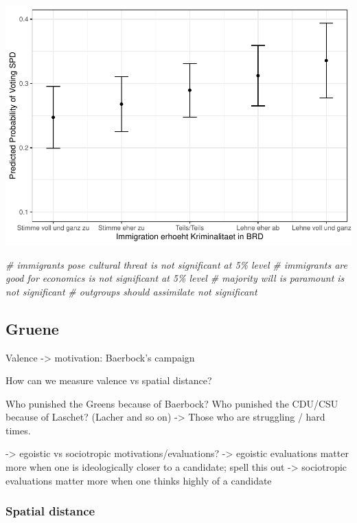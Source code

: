 \documentclass[
]{article}
\newenvironment{Shaded}{\begin{snugshade}}{\end{snugshade}}
\newcommand{\CommentTok}[1]{\textcolor[rgb]{0.56,0.35,0.01}{\textit{#1}}}
\begin{document}
\includegraphics{AVCD_Final_Assignment-Edenhofer_files/figure-latex/spd-immig-crime-1.pdf}

\begin{Shaded}
\begin{Highlighting}[]
\CommentTok{\# immigrants pose cultural threat is not significant at 5\% level }
\CommentTok{\# immigrants are good for economics is not significant at 5\% level }
\CommentTok{\# majority will is paramount is not significant }
\CommentTok{\# outgroups should assimilate not significant }
\end{Highlighting}
\end{Shaded}

\hypertarget{gruene}{%
\subsection{Gruene}\label{gruene}}

Valence -\textgreater{} motivation: Baerbock's campaign

How can we measure valence vs spatial distance?

Who punished the Greens because of Baerbock? Who punished the CDU/CSU
because of Laschet? (Lacher and so on) -\textgreater{} Those who are
struggling / hard times.

-\textgreater{} egoistic vs sociotropic motivations/evaluations?
-\textgreater{} egoistic evaluations matter more when one is
ideologically closer to a candidate; spell this out -\textgreater{}
sociotropic evaluations matter more when one thinks highly of a
candidate

\hypertarget{spatial-distance}{%
\subsubsection{Spatial distance}\label{spatial-distance}}
\end{document}
